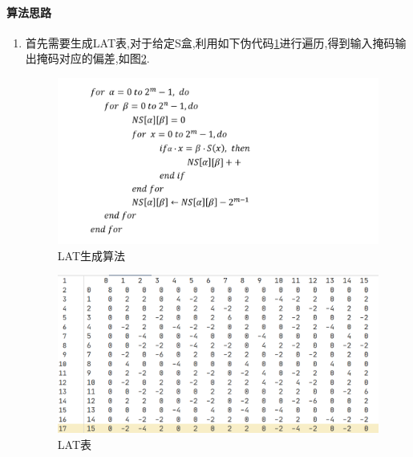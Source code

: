 \documentclass[UTF-8]{ctexart}
\begin{document}
\paragraph{算法思路}
\begin{enumerate}
	\item 首先需要生成LAT表,对于给定S盒,利用如下伪代码\cref{fig:latgen}进行遍历,得到输入掩码输出掩码对应的偏差,如图\cref{fig:lat}.
	\begin{figure}[!htbp]
		\centering
		\includegraphics[width=0.7\linewidth]{LAT_gen}
		\caption{LAT生成算法}
		\label{fig:latgen}
	\end{figure}
	\begin{figure}[!htbp]
		\centering
		\includegraphics[width=0.7\linewidth]{LAT}
		\caption{LAT表}
		\label{fig:lat}
	\end{figure}
	
	
	

\end{enumerate}
\end{document}
